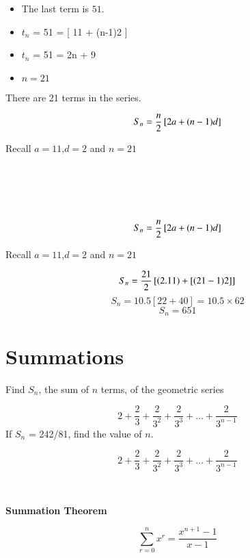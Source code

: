 \documentclass[12pt]{article}
\begin{document}
\begin{itemize}
\item The last term is $51$.
\item $t_n$ = 51 = [ 11 + (n-1)2 ] 
\item $t_n$ = 51 = 2n + 9
\item $n=21$
\end{itemize}
There are 21 terms in the series.

\[ S_n  = {n \over 2} \left[ 2a+(n-1)d \right] \]

Recall $a=11$,$d=2$ and $n=21$

\[ \phantom{S_n  = {21 \over 2} \left[ (2.11) +[(21-1)2] \right]} \]
\[ \phantom{S_n  = 10.5 \left[ 22 + 40 \right]  = 10.5 \times 62}\]
\[ \phantom{S_n  = 651} \] 

\[ S_n  = {n \over 2} \left[ 2a+(n-1)d \right] \]

Recall $a=11$,$d=2$ and $n=21$


\[ S_n  = {21 \over 2} \left[ (2.11) +[(21-1)2] \right] \]
\[ S_n  = 10.5 \left[ 22 + 40 \right]  = 10.5 \times 62\]
\[ S_n  = 651 \] 




\section{Summations}

Find $S_n$, the sum of $n$ terms, of the geometric series

\[  2 + \frac{2}{3} + \frac{2}{3^2} + \frac{2}{3^3} +  \ldots + \frac{2}{3^{n-1}} \]
\bigskip
If $S_n$ = 242/81, find the value of $n$.





\[  2 + \frac{2}{3} + \frac{2}{3^2} + \frac{2}{3^3} +  \ldots + \frac{2}{3^{n-1}} \]
\[ \phantom{ 2 \times \left[ 1 + \frac{1}{3} + \frac{1}{3^2} + \frac{1}{3^3} +  \ldots + \frac{1}{3^{n-1}}   \right]  } \]


\textbf{Summation Theorem}

\[ \sum^{n}_{r=0} x^r = \frac{x^{n+1}-1}{x-1} \]
\[ \phantom{k \sum^{n}_{r=0} x^r = k \frac{x^{n+1}-1}{x-1}  } \]
\phantom{Here $k=2$ and $x = 1/3$ }
\end{document}

